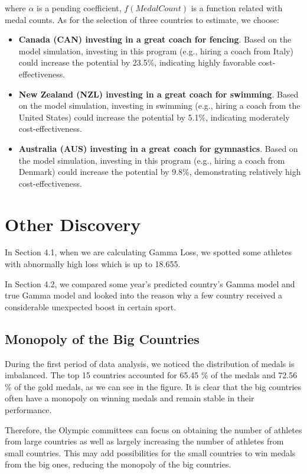 \documentclass{mcmthesis}
\begin{document}
where $\alpha$ is a pending coefficient, $f(MedalCount)$ is a function related with medal counts. As for the selection of three countries to estimate, we choose:
\begin{itemize}
    \item {\bf Canada (CAN) investing in a great coach for fencing}. 
    Based on the model simulation, investing in this program (e.g., hiring a coach from Italy) could increase the potential by 23.5\%, indicating highly favorable cost-effectiveness.
    \item {\bf New Zealand (NZL) investing in a great coach for swimming}. 
     Based on the model simulation, investing in swimming (e.g., hiring a coach from the United States) could increase the potential by 5.1\%, indicating moderately cost-effectiveness.
     \item {\bf Australia (AUS) investing in a great coach for gymnastics}. 
     Based on the model simulation, investing in this program (e.g., hiring a coach from Denmark) could increase the potential by 9.8\%, demonstrating relatively high cost-effectiveness.
\end{itemize}



\section{Other Discovery}
\label{sec:8}

In Section 4.1, when we are calculating Gamma Loss, we spotted some athletes with abnormally high loss which is up to 18.655. 

In Section 4.2, we compared some year's predicted country's Gamma model and true Gamma model and looked into the reason why a few country received a considerable unexpected boost in certain sport.\\

\subsection{Monopoly of the Big Countries}

During the first period of data analysis, we noticed the distribution of medals is imbalanced. The top 15 countries accounted for 65.45 \% of the medals and 72.56 \% of the gold medals, as we can see in the figure. It is clear that the big countries often have a monopoly on winning medals and remain stable in their performance.

Therefore, the Olympic committees can focus on obtaining the number of athletes from large countries as well as largely increasing the number of athletes from small countries. This may add possibilities for the small countries to win medals from the big ones, reducing the monopoly of the big countries.
\end{document}
